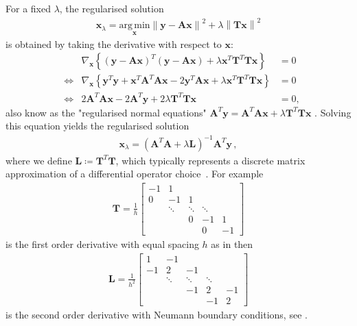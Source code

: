 For a fixed $\lambda$, the regularised solution
\begin{align}
	\bm{x}_{\lambda} = \underset{\bm{x}}{\mathrm{arg\,min}} \left\lVert \bm{y} - \bm{A} \bm{x} \right\rVert^2 + \lambda \left\lVert \bm{T} \bm{x} \right\rVert^2
\end{align}
is obtained by taking the derivative with respect to $\bm{x}$:
\begin{align}
	& & \nabla_{\bm{x}} \left\{ (\bm{y} - \bm{A} \bm{x})^T (\bm{y} - \bm{A} \bm{x}) + \lambda \bm{x}^T \bm{T}^T \bm{T} \bm{x} \right\} &= 0 \\
	&\iff & \nabla_{\bm{x}} \left\{ \bm{y}^T \bm{y} + \bm{x}^T \bm{A}^T \bm{A} \bm{x} - 2 \bm{y}^T \bm{A} \bm{x} + \lambda \bm{x}^T \bm{T}^T \bm{T} \bm{x} \right\} &= 0 \\
	&\iff & 2 \bm{A}^T \bm{A} \bm{x} - 2 \bm{A}^T \bm{y} + 2 \lambda \bm{T}^T \bm{T} \bm{x} &= 0,
\end{align}
also know as the "regularised normal equations" $\bm{A}^T \bm{y} = \bm{A}^T \bm{A} \bm{x} + \lambda \bm{T}^T \bm{T} \bm{x}$ \cite{Hansen2001LCurve}.
Solving this equation yields the regularised solution
\begin{align}
	\bm{x}_{\lambda} = (\bm{A}^T \bm{A} + \lambda \bm{L})^{-1} \bm{A}^T \bm{y} \, , \label{eq:regSol}
\end{align}
where we define $\bm{L} \coloneqq \bm{T}^T \bm{T}$, which typically represents a discrete matrix approximation of a differential operator choice~\cite{tan2016LecNot}.
For example
\begin{align}
	\bm{T} = \frac{1}{h}
	\begin{bmatrix}
		-1 & 1 & & &  \\
		0 & -1 & 1 & &   \\
		& \ddots & \ddots & \ddots &\\ 
		& & 0 & -1 & 1  \\
		& & & 0 & -1 
	\end{bmatrix} 
\end{align}
is the first order derivative with equal spacing $h$ as in \cite{tan2016LecNot} then
\begin{align}
	\bm{L} = \frac{1}{h^2}
	\begin{bmatrix}
		1 & -1 & & &  \\
		-1 & 2& -1 & &   \\
		& \ddots & \ddots & \ddots &\\ 
		& & -1 & 2 & -1  \\
		& & & -1 & 2 
	\end{bmatrix} 
\end{align}
is the second order derivative with Neumann boundary conditions, see \cite{wang2015graphs}.

